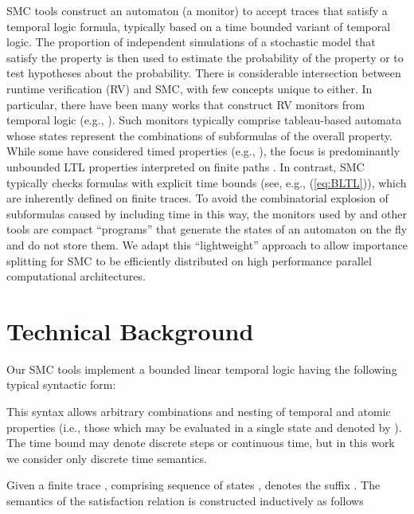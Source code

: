 \documentclass{llncs}
\begin{document}
SMC tools construct an automaton (a monitor) to accept traces that
satisfy a temporal logic formula, typically based on a time bounded
variant of temporal logic. The proportion of independent simulations
of a stochastic model that satisfy the property is then used to estimate
the probability of the property or to test hypotheses about the probability.
There is considerable intersection between runtime verification (RV)
and SMC, with few concepts unique to either. In particular, there
have been many works that construct RV monitors from temporal logic
(e.g., \cite{Geilen2001,GiannakopoulouHavelund2001,HavelundRosu2002,FinkbeinerSipma2004,BauerLeuckerSchallhart2006}).
Such monitors typically comprise tableau-based automata \cite{GerthPeledVardiWolper1995}
whose states represent the combinations of subformulas of the overall
property. While some have considered timed properties (e.g., \cite{BauerLeuckerSchallhart2006}),
the focus is predominantly unbounded LTL properties interpreted on
finite paths \cite{Eisner-et-al2003}. In contrast, SMC typically
checks formulas with explicit time bounds (see, e.g., (\ref{eq:BLTL})),
which are inherently defined on finite traces. To avoid the combinatorial
explosion of subformulas caused by including time in this way, the
monitors used by \cite{SedwardsJegourelLegay2012,BoyerCorreLegaySedwards2013}
and other tools are compact ``programs'' that generate the states
of an automaton on the fly and do not store them. We adapt this ``lightweight''
approach to allow importance splitting for SMC to be efficiently distributed
on high performance parallel computational architectures.


\section{Technical Background}

Our SMC tools \cite{SedwardsJegourelLegay2012,BoyerCorreLegaySedwards2013}
implement a bounded linear temporal logic having the following typical
syntactic form:




This syntax allows arbitrary combinations and nesting of temporal
and atomic properties (i.e., those which may be evaluated in a single
state and denoted by ). The time bound  may denote discrete
steps or continuous time, but in this work we consider only discrete
time semantics.

Given a finite trace , comprising sequence of states ,
 denotes the suffix .
The semantics of the satisfaction relation  is constructed
inductively as follows
\end{document}
